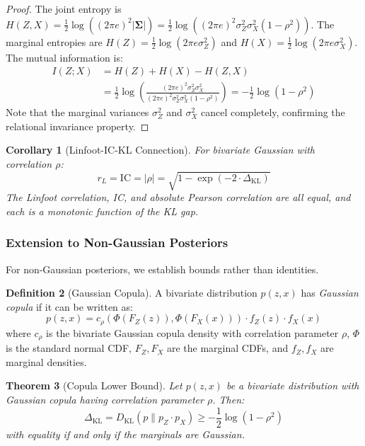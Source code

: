 \documentclass[10pt]{article} %
\theoremstyle{plain}
\newtheorem{theorem}{Theorem}[section]
\newtheorem{corollary}[theorem]{Corollary}
\theoremstyle{definition}
\newtheorem{definition}[theorem]{Definition}
\newcommand{\IC}{\mathrm{IC}}  %
\begin{document}
\begin{proof}
The joint entropy is $H(Z, X) = \frac{1}{2}\log\left((2\pi e)^2 |\boldsymbol{\Sigma}|\right) = \frac{1}{2}\log\left((2\pi e)^2 \sigma_Z^2 \sigma_X^2 (1 - \rho^2)\right)$. The marginal entropies are $H(Z) = \frac{1}{2}\log(2\pi e \sigma_Z^2)$ and $H(X) = \frac{1}{2}\log(2\pi e \sigma_X^2)$. The mutual information is:
\begin{align}
I(Z; X) &= H(Z) + H(X) - H(Z, X) \\
&= \frac{1}{2}\log\left(\frac{(2\pi e)^2 \sigma_Z^2 \sigma_X^2}{(2\pi e)^2 \sigma_Z^2 \sigma_X^2 (1 - \rho^2)}\right) = -\frac{1}{2}\log(1 - \rho^2)
\end{align}
Note that the marginal variances $\sigma_Z^2$ and $\sigma_X^2$ cancel completely, confirming the relational invariance property.
\end{proof}

\begin{corollary}[Linfoot-IC-KL Connection]
\label{cor:linfoot-kl}
For bivariate Gaussian with correlation $\rho$:
\begin{equation}
r_L = \IC = |\rho| = \sqrt{1 - \exp(-2 \cdot \Delta_{\text{KL}})}
\end{equation}
The Linfoot correlation, IC, and absolute Pearson correlation are all equal, and each is a monotonic function of the KL gap.
\end{corollary}

\subsubsection{Extension to Non-Gaussian Posteriors}

For non-Gaussian posteriors, we establish bounds rather than identities.

\begin{definition}[Gaussian Copula]
A bivariate distribution $p(z, x)$ has \emph{Gaussian copula} if it can be written as:
\begin{equation}
p(z, x) = c_\rho(\Phi(F_Z(z)), \Phi(F_X(x))) \cdot f_Z(z) \cdot f_X(x)
\end{equation}
where $c_\rho$ is the bivariate Gaussian copula density with correlation parameter $\rho$, $\Phi$ is the standard normal CDF, $F_Z, F_X$ are the marginal CDFs, and $f_Z, f_X$ are marginal densities.
\end{definition}

\begin{theorem}[Copula Lower Bound]
\label{thm:copula-bound}
Let $p(z, x)$ be a bivariate distribution with Gaussian copula having correlation parameter $\rho$. Then:
\begin{equation}
\Delta_{\text{KL}} = D_{\text{KL}}(p \| p_Z \cdot p_X) \geq -\frac{1}{2}\log(1 - \rho^2)
\end{equation}
with equality if and only if the marginals are Gaussian.
\end{theorem}
\end{document}
